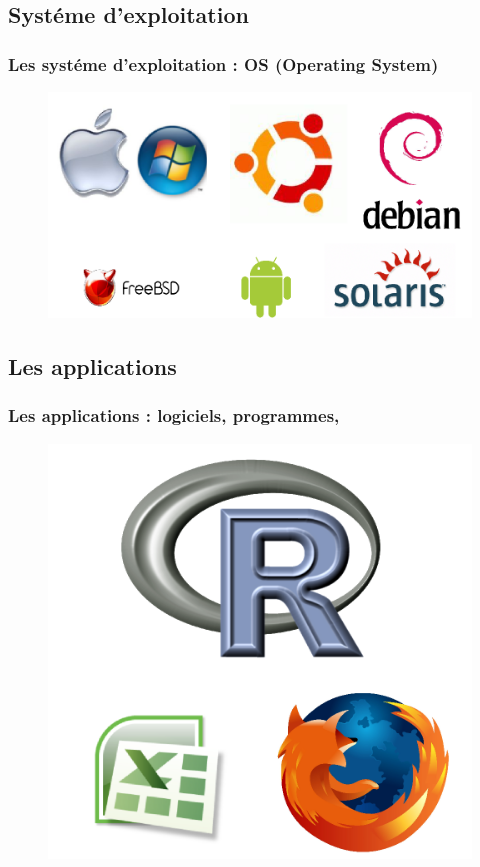 \documentclass{beamer}
\begin{document}
\subsection{Systéme d'exploitation}
\begin{frame}
	\frametitle{Les systéme d'exploitation : OS (Operating System)}
	\begin{figure}
		\includegraphics[scale=0.55]{image/OSimage.png}
	\end{figure}
\end{frame}

\subsection{Les applications}
\begin{frame}
	\frametitle{Les applications : logiciels, programmes, }
	\begin{figure}[h]
		\begin{center}
		  \includegraphics[scale=0.45]{image/software.png}
		\end{center}
	\end{figure}
\end{frame}
\end{document}

